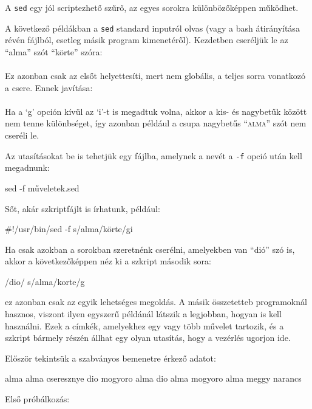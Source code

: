 A \texttt{sed} egy jól scriptezhető szűrő, az egyes sorokra különbözőképpen
működhet.

A következő példákban a \texttt{sed} standard inputról olvas (vagy a bash
átirányítása révén fájlból, esetleg másik program kimenetéről). Kezdetben
cseréljük le az ``alma'' szót ``körte'' szóra:\\
\\
Ez azonban csak az elsőt helyettesíti, mert nem globális, a teljes sorra
vonatkozó a csere. Ennek javítása:\\
\\
Ha a `g' opción kívül az `i'-t is megadtuk volna, akkor a kis- és nagybetűk
között nem tenne különbséget, így azonban például a csupa nagybetűs
``\textsc{alma}'' szót nem cseréli le.

Az utasításokat be is tehetjük egy fájlba, amelynek a nevét a \texttt{-f} opció
után kell megadnunk:

\begin{VerbExample}
sed -f műveletek.sed
\end{VerbExample}

\noindent Sőt, akár szkriptfájlt is írhatunk, például:

\begin{VerbExample}
#!/usr/bin/sed -f
s/alma/körte/gi
\end{VerbExample}

\noindent Ha csak azokban a sorokban szeretnénk cserélni, amelyekben van ``dió''
szó is, akkor a következőképpen néz ki a szkript második sora:

\begin{VerbExample}
/dio/ s/alma/korte/g
\end{VerbExample}

\noindent ez azonban csak az egyik lehetséges megoldás. A másik összetetteb
programoknál hasznos, viszont ilyen egyszerű példánál látszik a legjobban,
hogyan is kell használni. Ezek a címkék, amelyekhez egy vagy több művelet
tartozik, és a szkript bármely részén állhat egy olyan utasítás, hogy a vezérlés
ugorjon ide.

Először tekintsük a szabványos bemenetre érkező adatot:

\begin{VerbExample}
alma alma cseresznye
dio mogyoro alma
dio alma
mogyoro alma meggy narancs
\end{VerbExample}

\noindent Első próbálkozás:

